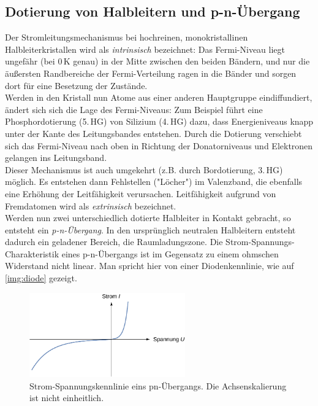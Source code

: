 \subsection{Dotierung von Halbleitern und p-n-Übergang}

Der Stromleitungsmechanismus bei hochreinen, monokristallinen Halbleiterkristallen
wird als \emph{intrinsisch} bezeichnet:
Das Fermi-Niveau liegt ungefähr (bei 0\,K genau) in der Mitte zwischen den beiden Bändern,
und nur die äußersten Randbereiche der Fermi-Verteilung ragen in die Bänder
und sorgen dort für eine Besetzung der Zustände.\\
Werden in den Kristall nun Atome aus einer anderen Hauptgruppe eindiffundiert,
ändert sich sich die Lage des Fermi-Niveaus:
Zum Beispiel führt eine Phosphordotierung (5.\,HG) von Silizium (4.\,HG) dazu,
dass Energieniveaus knapp unter der Kante des Leitungsbandes entstehen.
Durch die Dotierung verschiebt sich das Fermi-Niveau nach oben in Richtung der Donatorniveaus und
Elektronen gelangen ins Leitungsband.\\
Dieser Mechanismus ist auch umgekehrt (z.B. durch Bordotierung, 3.\,HG) möglich.
Es entstehen dann Fehlstellen ("Löcher") im Valenzband,
die ebenfalls eine Erhöhung der Leitfähigkeit verursachen.
Leitfähigkeit aufgrund von Fremdatomen wird als \emph{extrinsisch} bezeichnet.\\[0.15cm]
Werden nun zwei unterschiedlich dotierte Halbleiter in Kontakt gebracht,
so entsteht ein \emph{p-n-Übergang}.
In den ursprünglich neutralen Halbleitern entsteht dadurch ein geladener Bereich, die Raumladungszone.
Die Strom-Spannungs-Charakteristik eines p-n-Übergangs ist im Gegensatz zu einem ohmschen Widerstand
nicht linear. Man spricht hier von einer Diodenkennlinie, wie auf \autoref{img:diode} gezeigt.
\begin{figure}[H]
\begin{center}
  \includegraphics[width=0.6\textwidth]{../img/diode.pdf}
  \caption{Strom-Spannungskennlinie eins pn-Übergangs.
  Die Achsenskalierung ist nicht einheitlich.}
  \label{img:diode}
\end{center}
\end{figure}
